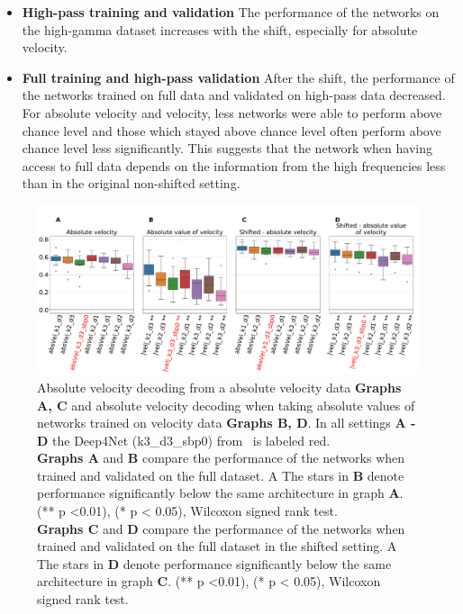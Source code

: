 \begin{itemize}
    \item \textbf{High-pass training and validation} The performance of the networks on the high-gamma dataset increases with the shift, especially for absolute velocity. 
    
    \item \textbf{Full training and high-pass validation} After the shift, the performance of the networks trained on full data and validated on high-pass data decreased. For absolute velocity and velocity, less networks were able to perform above chance level and those which stayed above chance level often perform above chance level less significantly. This suggests that the network when having access to full data depends on the information from the high frequencies less than in the original non-shifted setting.

\end{itemize}

\begin{figure}[!htpb]
\centering
   \includegraphics[width=1\linewidth]{img/ch4/absVel_vs_abs_vel_performance_comparison}
   \caption[Absolute velocity vs. absolute value of velocity comparison]{Absolute velocity decoding from a absolute velocity data \textbf{Graphs A, C} and absolute velocity decoding when taking absolute values of networks trained on velocity data \textbf{Graphs B, D}. In all settings \textbf{
   A - D} the Deep4Net (k3\_d3\_sbp0) from~\cite{Hammer-2021} is labeled red.\\ \textbf{Graphs A} and \textbf{B} compare the performance of the networks when trained and validated on the full dataset. A The stars in \textbf{B} denote performance significantly below the same architecture in graph \textbf{A}. (** p <0.01), (* p < 0.05), Wilcoxon signed rank test.
   \\\textbf{Graphs C} and \textbf{D} compare the performance of the networks when trained and validated on the full dataset in the shifted setting. A The stars in \textbf{D} denote performance significantly below the same architecture in graph \textbf{C}. (** p <0.01), (* p < 0.05), Wilcoxon signed rank test.}
   \label{fig:absVel-vs-abs-vel-performance}
\end{figure}


